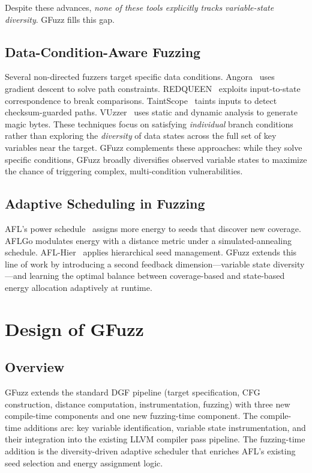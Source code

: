\documentclass[preprint,12pt,3p]{elsarticle}
\begin{document}
Despite these advances, \emph{none of these tools explicitly tracks
variable-state diversity}.  GFuzz fills this gap.

\subsection{Data-Condition-Aware Fuzzing}

Several non-directed fuzzers target specific data conditions.
Angora~\cite{chen2018angora} uses gradient descent to solve path constraints.
REDQUEEN~\cite{aschermann2019redqueen} exploits input-to-state correspondence
to break comparisons.  TaintScope~\cite{wang2010taintscope} taints inputs to
detect checksum-guarded paths.  VUzzer~\cite{rawat2017vuzzer} uses static and
dynamic analysis to generate magic bytes.  These techniques focus on satisfying
\emph{individual} branch conditions rather than exploring the \emph{diversity}
of data states across the full set of key variables near the target.  GFuzz
complements these approaches: while they solve specific conditions, GFuzz
broadly diversifies observed variable states to maximize the chance of
triggering complex, multi-condition vulnerabilities.

\subsection{Adaptive Scheduling in Fuzzing}

AFL's power schedule~\cite{afl} assigns more energy to seeds that discover
new coverage.  AFLGo modulates energy with a distance metric under a
simulated-annealing schedule.  AFL-Hier~\cite{aflhier} applies hierarchical
seed management.  GFuzz extends this line of work by introducing a second
feedback dimension—variable state diversity—and learning the optimal balance
between coverage-based and state-based energy allocation adaptively at runtime.

\section{Design of GFuzz}
\label{sec:design}

\subsection{Overview}

GFuzz extends the standard DGF pipeline (target specification, CFG
construction, distance computation, instrumentation, fuzzing) with three new
compile-time components and one new fuzzing-time component.  The
compile-time additions are: key variable identification, variable state
instrumentation, and their integration into the existing LLVM compiler
pass pipeline.  The fuzzing-time addition is the diversity-driven adaptive
scheduler that enriches AFL's existing seed selection and energy assignment
logic.
\end{document}
